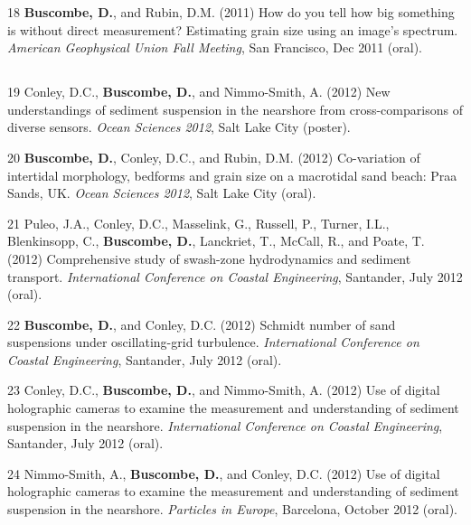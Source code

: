 \documentclass[margin,line]{resume}
\begin{document}
\begin{resume}
\begin{footnotesize}
\begin{list1}
        \item[18] {\bf Buscombe, D.}, and Rubin, D.M. (2011) How do you tell how big something is without direct measurement? Estimating grain size using an image’s spectrum. {\sl American Geophysical Union Fall Meeting}, San Francisco, Dec 2011 (oral).
	\end{list1}

	\subsection{}
	\begin{list1}
        \item[19] Conley, D.C., {\bf Buscombe, D.}, and Nimmo-Smith, A. (2012) New understandings of sediment suspension in the nearshore from cross-comparisons of diverse  sensors. {\sl Ocean Sciences 2012}, Salt Lake City (poster).\\

	\item[20] {\bf Buscombe, D.}, Conley, D.C., and Rubin, D.M. (2012) Co-variation of intertidal morphology, bedforms and grain size on a macrotidal sand beach: Praa Sands, UK. {\sl Ocean Sciences 2012}, Salt Lake City (oral).\\

	\item[21] Puleo, J.A., Conley, D.C., Masselink, G., Russell, P., Turner, I.L., Blenkinsopp, C., {\bf Buscombe, D.}, Lanckriet, T., McCall, R., and Poate, T. (2012) Comprehensive study of swash-zone hydrodynamics and sediment transport. {\sl International Conference on Coastal Engineering}, Santander, July 2012 (oral).\\

	\item[22] {\bf Buscombe, D.}, and Conley, D.C. (2012) Schmidt number of sand suspensions under oscillating-grid turbulence. {\sl International Conference on Coastal Engineering}, Santander, July 2012 (oral).\\

	\item[23] Conley, D.C., {\bf Buscombe, D.}, and Nimmo-Smith, A. (2012) Use of digital holographic cameras to examine the measurement and understanding of sediment suspension in the nearshore. {\sl International Conference on Coastal Engineering}, Santander, July 2012 (oral).\\

	\item[24] Nimmo-Smith, A., {\bf Buscombe, D.}, and Conley, D.C. (2012) Use of digital holographic cameras to examine the measurement and understanding of sediment suspension in the nearshore. {\sl Particles in Europe}, Barcelona, October 2012 (oral).
	\end{list1}


\end{footnotesize}
\end{resume}
\end{document}
